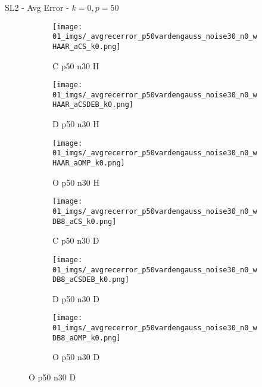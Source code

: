 \begin{frame}{SL2 - Avg Error - $k=0,p=50$}{}
\begin{figure}
\vspace{5pt}

\begin{subfigure}{0.13\textwidth}
\texttt{[image: 01\_imgs/\_avgrecerror\_p50vardengauss\_noise30\_n0\_wHAAR\_aCS\_k0.png]}
\caption*{\tiny C p50 n30 H}
\end{subfigure}
\begin{subfigure}{0.13\textwidth}
\texttt{[image: 01\_imgs/\_avgrecerror\_p50vardengauss\_noise30\_n0\_wHAAR\_aCSDEB\_k0.png]}
\caption*{\tiny D p50 n30 H}
\end{subfigure}
\begin{subfigure}{0.13\textwidth}
\texttt{[image: 01\_imgs/\_avgrecerror\_p50vardengauss\_noise30\_n0\_wHAAR\_aOMP\_k0.png]}
\caption*{\tiny O p50 n30 H}
\end{subfigure}
\begin{subfigure}{0.13\textwidth}
\texttt{[image: 01\_imgs/\_avgrecerror\_p50vardengauss\_noise30\_n0\_wDB8\_aCS\_k0.png]}
\caption*{\tiny C p50 n30 D}
\end{subfigure}
\begin{subfigure}{0.13\textwidth}
\texttt{[image: 01\_imgs/\_avgrecerror\_p50vardengauss\_noise30\_n0\_wDB8\_aCSDEB\_k0.png]}
\caption*{\tiny D p50 n30 D}
\end{subfigure}
\begin{subfigure}{0.13\textwidth}
\texttt{[image: 01\_imgs/\_avgrecerror\_p50vardengauss\_noise30\_n0\_wDB8\_aOMP\_k0.png]}
\caption*{\tiny O p50 n30 D}
\end{subfigure}
\end{figure}
\end{frame}


